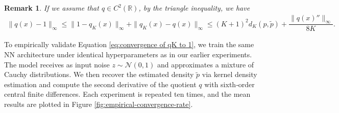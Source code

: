 \documentclass{article}
\newtheorem{remark}{Remark}[section]
\begin{document}
\begin{remark} \label{remark:extansion of bertein to other domains}
 If we assume that $q\in C^{2}(\mathbb{R})$, by the triangle inequality, we have 
        \begin{align}\label{eq:convergence of qK to 1}
            \|q(x) - 1\|_{\infty}\leq \|1 - q_{K}(x)\|_{\infty} + \|q_{K}(x) - q(x)\|_{\infty} \leq (K+1)^{2} d_{K}(p, \tilde{p}) + \dfrac{\|q(x)''\|_{\infty}}{8K}.
        \end{align}
\end{remark}



To empirically validate Equation \ref{eq:convergence of qK to 1}, we train the same NN architecture under identical hyperparameters as in our earlier experiments. The model receives as input noise \(z\sim\mathcal{N}(0,1)\) and approximates a mixture of Cauchy distributions. We then recover the estimated density \(\tilde p\) via kernel density estimation and compute the second derivative of the quotient \(q\) with sixth‐order central finite differences. Each experiment is repeated ten times, and the mean results are plotted in Figure \ref{fig:empirical-convergence-rate}.


\end{document}
